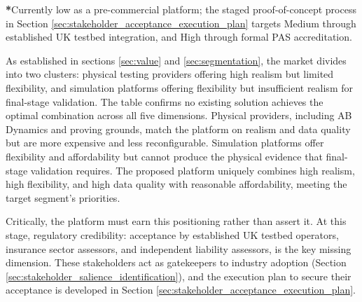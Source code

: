\documentclass[11pt, a4paper]{report}
\numberwithin{equation}{section}
\begin{document}
\begin{refsection}
\begin{table}[h!]
\begin{minipage}{0.95\linewidth}
\footnotesize
\textbf{*}Currently low as a pre-commercial platform; the staged proof-of-concept process in Section \ref{sec:stakeholder_acceptance_execution_plan} targets Medium through established UK testbed integration, and High through formal PAS accreditation.
\end{minipage}

\end{table}

As established in sections \ref{sec:value} and \ref{sec:segmentation}, the market divides into two clusters: physical testing providers offering high realism but limited flexibility, and simulation platforms offering flexibility but insufficient realism for final-stage validation. The table confirms no existing solution achieves the optimal combination across all five dimensions. Physical providers, including AB Dynamics and proving grounds, match the platform on realism and data quality but are more expensive and less reconfigurable. Simulation platforms offer flexibility and affordability but cannot produce the physical evidence that final-stage validation requires. The proposed platform uniquely combines high realism, high flexibility, and high data quality with reasonable affordability, meeting the target segment's priorities.

Critically, the platform must earn this positioning rather than assert it. At this stage, regulatory credibility: acceptance by established UK testbed operators, insurance sector assessors, and independent liability assessors, is the key missing dimension. These stakeholders act as gatekeepers to industry adoption (Section \ref{sec:stakeholder_salience_identification}), and the execution plan to secure their acceptance is developed in Section \ref{sec:stakeholder_acceptance_execution_plan}.




\end{refsection}
\end{document}
